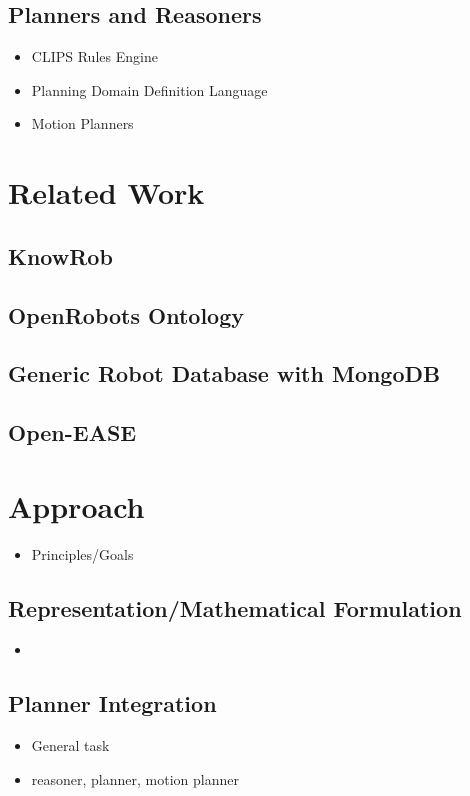\documentclass[a4paper,11pt]{article}
\begin{document}
\subsection{Planners and Reasoners}
\begin{itemize}
\item CLIPS Rules Engine
\item Planning Domain Definition Language
\item Motion Planners
\end{itemize}


\section{Related Work}

\subsection{KnowRob}
\subsection{OpenRobots Ontology}
\subsection{Generic Robot Database with MongoDB}
\subsection{Open-EASE}


\section{Approach}
\begin{itemize}
\item Principles/Goals
\end{itemize}
\subsection{Representation/Mathematical Formulation}
\begin{itemize}
\item 
\end{itemize}
\subsection{Planner Integration}
\begin{itemize}
\item General task
\item reasoner, planner, motion planner
\end{itemize}
\end{document}
